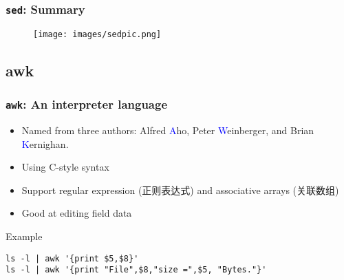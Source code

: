 \documentclass[red]{beamer}
\begin{document}
\begin{CJK*}{UTF8}{gbsn}
\begin{frame}
\frametitle{\texttt{sed}: Summary}
\begin{figure}[ht]
\texttt{[image: images/sedpic.png]}
\end{figure}
\end{frame}

\subsection{awk}

\begin{frame}
\frametitle{\texttt{awk}: An interpreter language}
\begin{itemize}
\footnotesize
	\item Named from three authors: Alfred \textcolor{blue}{A}ho, 
		Peter \textcolor{blue}{W}einberger, and Brian \textcolor{blue}{K}ernighan.
	\item Using C-style syntax
	\item Support regular expression (正则表达式) and associative 
		arrays (关联数组)
	\item Good at editing field data
\end{itemize}
\begin{block}{\centering\footnotesize Example}
\begin{lstlisting}
ls -l | awk '{print $5,$8}'
ls -l | awk '{print "File",$8,"size =",$5, "Bytes."}'
\end{lstlisting}
\end{block}
\end{frame}


\end{CJK*}
\end{document}
